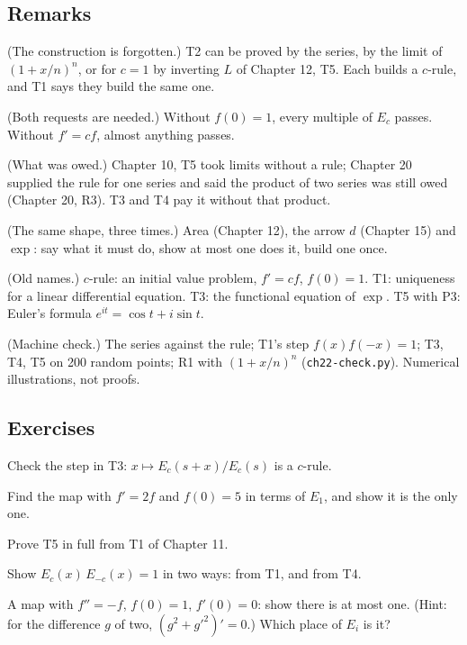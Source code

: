 \subsection*{Remarks}

\begin{lines}
\item[\lab{R1}] (The construction is forgotten.) T2 can be proved by the series, by the limit of $(1 + x/n)^n$, or for $c = 1$ by inverting $L$ of Chapter 12, T5. Each builds a $c$-rule, and T1 says they build the same one.
\item[\lab{R2}] (Both requests are needed.) Without $f(0) = 1$, every multiple of $E_c$ passes. Without $f' = c f$, almost anything passes.
\item[\lab{R3}] (What was owed.) Chapter 10, T5 took limits without a rule; Chapter 20 supplied the rule for one series and said the product of two series was still owed (Chapter 20, R3). T3 and T4 pay it without that product.
\item[\lab{R4}] (The same shape, three times.) Area (Chapter 12), the arrow $d$ (Chapter 15) and $\exp$: say what it must do, show at most one does it, build one once.
\item[\lab{R5}] (Old names.) $c$-rule: an initial value problem, $f' = c f$, $f(0) = 1$. T1: uniqueness for a linear differential equation. T3: the functional equation of $\exp$. T5 with P3: Euler's formula $e^{it} = \cos t + i \sin t$.
\item[\lab{R6}] (Machine check.) The series against the rule; T1's step $f(x) f(-x) = 1$; T3, T4, T5 on 200 random points; R1 with $(1 + x/n)^n$ (\texttt{ch22-check.py}). Numerical illustrations, not proofs.
\end{lines}

\subsection*{Exercises}

\begin{lines}
\item[\lab{E1}] Check the step in T3: $x \mapsto E_c(s + x)/E_c(s)$ is a $c$-rule.
\item[\lab{E2}] Find the map with $f' = 2 f$ and $f(0) = 5$ in terms of $E_1$, and show it is the only one.
\item[\lab{E3}] Prove T5 in full from T1 of Chapter 11.
\item[\lab{E4}] Show $E_c(x)\,E_{-c}(x) = 1$ in two ways: from T1, and from T4.
\item[\lab{E5}] A map with $f'' = -f$, $f(0) = 1$, $f'(0) = 0$: show there is at most one. (Hint: for the difference $g$ of two, $(g^2 + g'^2)' = 0$.) Which place of $E_i$ is it?
\end{lines}

